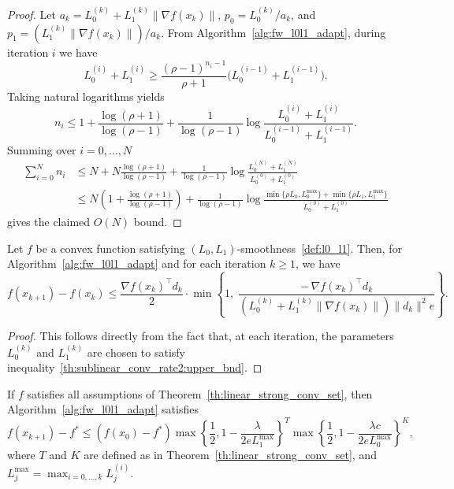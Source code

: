 \documentclass[runningheads]{llncs}
\begin{document}
	\begin{proof}
		Let $a_k = L_0^{(k)} + L_1^{(k)} \|\nabla f(x_k)\|$, $p_0 = L_0^{(k)} / a_k$, and $p_1 = (L_1^{(k)} \|\nabla f(x_k)\|) / a_k$.  
		From Algorithm~\ref{alg:fw_l0l1_adapt}, during iteration $i$ we have
		\[
		L_0^{(i)} + L_1^{(i)} 
		\ge 
		\frac{(\rho - 1)^{n_i - 1}}{\rho + 1}
		\bigl(L_0^{(i-1)} + L_1^{(i-1)}\bigr).
		\]
		Taking natural logarithms yields
		\[
		n_i 
		\le 
		1 
		+ \frac{\log(\rho + 1)}{\log(\rho - 1)}
		+ \frac{1}{\log(\rho - 1)}
		\log\frac{L_0^{(i)} + L_1^{(i)}}{L_0^{(i-1)} + L_1^{(i-1)}}.
		\]
		Summing over $i = 0, \dots, N$
		\[
		\begin{aligned}
			\sum_{i=0}^{N} n_i 
			&\le 
			N 
			+ N \frac{\log(\rho + 1)}{\log(\rho - 1)}
			+ \frac{1}{\log(\rho - 1)}
			\log\frac{L_0^{(N)} + L_1^{(N)}}{L_0^{(0)} + L_1^{(0)}} 
			\\
			&\leq 
			N \!\left(1 + \frac{\log(\rho + 1)}{\log(\rho - 1)}\right)
			+ \frac{1}{\log(\rho - 1)} 
			\log\!\frac{\min \{\rho L_0, L_0^{\max}\}  + \min \{\rho L_1, L_1^{\max}\} }{L_0^{(0)} + L_1^{(0)}}
		\end{aligned}
		\]
		gives the claimed $O(N)$ bound.
	\end{proof}
	
	\begin{lemma}\label{lemma:descent_lemma_adapt}
		Let $f$ be a convex function satisfying $(L_0,L_1)$-smoothness~\ref{def:l0_l1}.  
		Then, for Algorithm~\ref{alg:fw_l0l1_adapt} and for each iteration $k \ge 1$, we have
		\begin{equation*}
			f(x_{k+1}) - f(x_k) \leq \frac{\nabla f(x_k)^\top d_k}{2} \cdot \min \left\{ 1,\;
			\frac{-\, \nabla f(x_k)^\top d_k}{\left(L_0^{(k)} + L_1^{(k)} \|\nabla f(x_k)\|\right) \|d_k\|^2 e} \right\}.
		\end{equation*}
	\end{lemma}
	
	\begin{proof}
		This follows directly from the fact that, at each iteration, the parameters $L_0^{(k)}$ and $L_1^{(k)}$ are chosen to satisfy inequality~\eqref{th:sublinear_conv_rate2:upper_bnd}.
	\end{proof}
	
	\begin{corollary}
		If $f$ satisfies all assumptions of Theorem~\ref{th:linear_strong_conv_set}, then Algorithm~\ref{alg:fw_l0l1_adapt} satisfies
		\begin{equation*}
			f(x_{k+1}) - f^*
			\leq (f(x_0) - f^*) 
			\max\left\lbrace {\frac{1}{2}}, 1 - \frac{\lambda}{2 e L_1^{\max}} \right\rbrace ^T
			\max\left\lbrace \frac{1}{2}, 1 - \frac{\lambda c}{2 e L_0^{\max}} \right\rbrace^K,
		\end{equation*}
		where $T$ and $K$ are defined as in Theorem~\ref{th:linear_strong_conv_set}, and $L_j^{\max} = \max_{i = 0, \dots, k} L_j^{(i)}$.
	\end{corollary}
	
\end{document}
